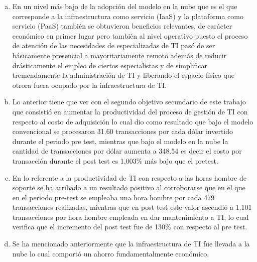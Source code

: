 \begin{enumerate}[a.]
          estos dejaron de ser propiedad de los representantes comerciales para
          pasar a ser clientes de la empresa, la disponibilidad de m\'ultiples
          an\'alisis provistos de manera autom\'atica por la aplicaci\'on y algo
          muy importante, la adopci\'on de las mejores pr\'acticas para el proceso
          de ventas las cuales vienen ya incorporadas en la soluci\'on adoptada.
    \item En un nivel m\'as bajo de la adopci\'on del modelo en la nube que es
          el que corresponde a la infraestructura como servicio (IaaS) y la
          plataforma como servicio (PaaS) tambi\'en se obtuvieron beneficios
          relevantes, de car\'acter econ\'omico en primer lugar pero tambi\'en
          al nivel operativo puesto el proceso de atenci\'on de las necesidades
          de especializadas de TI pas\'o de ser b\'asicamente presencial a
          mayoritariamente remoto adem\'as de reducir dr\'asticamente el empleo
          de ciertos especialistas y de simplificar tremendamente la administraci\'on
          de TI y liberando el espacio f\'isico que otrora fuera ocupado por la
          infraestructura de TI.
    \item Lo anterior tiene que ver con el segundo objetivo secundario de este
          trabajo que consisti\'o en aumentar la productividad del proceso de
          gesti\'on de TI con respecto al costo de adquisici\'on lo cual dio como
          resultado que bajo el modelo convencional se procesaron 31.60 transacciones
          por cada d\'olar invertido durante el periodo pre test, mientras que
          bajo el modelo en la nube la cantidad de transacciones por d\'olar
          aumenta a 348.54 es decir el costo por transacci\'on durante el post
          test es 1,003\% m\'as bajo que el pretest.
    \item En lo referente a la productividad de TI con respecto a las horas
          hombre de soporte se ha arribado a un resultado positivo al corroborarse
          que en el que en el periodo pre-test se empleaba una hora hombre por
          cada 479 transacciones realizadas, mientras que en post test este valor
          ascendi\'o a 1,101 transacciones por hora hombre empleada en dar
          mantenimiento a TI, lo cual verifica que el incremento del post test
          fue de 130\% con respecto al pre test.
    \item Se ha mencionado anteriormente que la infraestructura de TI fue llevada
          a la nube lo cual comport\'o un ahorro fundamentalmente econ\'omico,

\end{enumerate}
